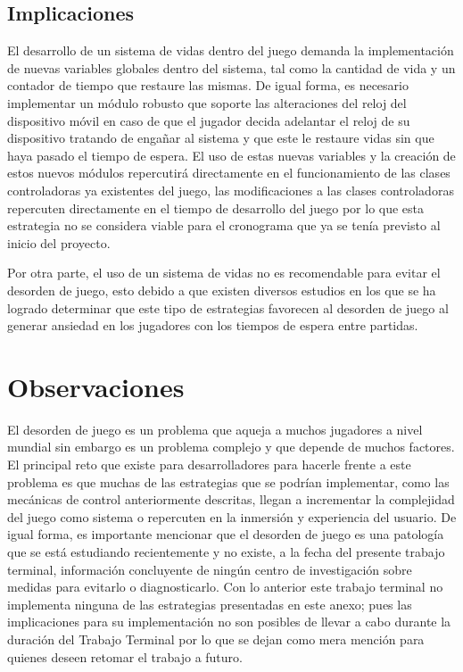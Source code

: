 \subsection{Implicaciones}
El desarrollo de un sistema de vidas dentro del juego demanda la implementación
de nuevas variables globales dentro del sistema, tal como la cantidad de vida y
un contador de tiempo que restaure las mismas. De igual forma, es necesario
implementar un módulo robusto que soporte las alteraciones del reloj del
dispositivo móvil en caso de que el jugador decida adelantar el reloj de su
dispositivo tratando de engañar al sistema y que este le restaure vidas sin que
haya pasado el tiempo de espera.  El uso de estas nuevas variables y la creación
de estos nuevos módulos repercutirá directamente en el funcionamiento de las
clases controladoras ya existentes del juego, las modificaciones a las clases
controladoras repercuten directamente en el tiempo de desarrollo del juego por
lo que esta estrategia no se considera viable para el cronograma que ya se tenía
previsto al inicio del proyecto.
\\
\par
Por otra parte, el uso de un sistema de vidas no es recomendable para evitar el
desorden de juego, esto debido a que existen diversos estudios en los que se ha
logrado determinar que este tipo de estrategias favorecen al desorden de juego
al generar ansiedad en los jugadores con los tiempos de espera entre partidas.

\section{Observaciones}
El desorden de juego es un problema que aqueja a muchos jugadores a nivel
mundial sin embargo es un problema complejo y que depende de muchos factores. El
principal reto que existe para desarrolladores para hacerle frente a este
problema es que muchas de las estrategias que se podrían implementar, como las
mecánicas de control anteriormente descritas, llegan a incrementar la
complejidad del juego como sistema o repercuten en la inmersión y experiencia
del usuario. De igual forma, es importante mencionar que el desorden de juego es
una patología que se está estudiando recientemente y no existe, a la fecha del
presente trabajo terminal, información concluyente de ningún centro de
investigación sobre medidas para evitarlo o diagnosticarlo. Con lo anterior este
trabajo terminal no implementa ninguna de las estrategias presentadas en este
anexo; pues las implicaciones para su implementación no son posibles de llevar a
cabo durante la duración del Trabajo Terminal por lo que se dejan como mera
mención para quienes deseen retomar el trabajo a futuro.